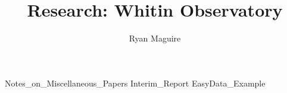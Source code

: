 \documentclass[crop=false,class=book,oneside]{standalone}
\begin{document}
    \newif\ifresearchwhitinobservatory
    \ifx\ifresearch\undefined
        \title{Research: Whitin Observatory}
        \author{Ryan Maguire}
        \date{\vspace{-5ex}}
        \maketitle
        \tableofcontents
        \listoffigures
        \listoftables
        \clearpage
    \fi
    
              {Notes_on_Miscellaneous_Papers}
    {Interim_Report}
    {EasyData_Example}
    \ifx\ifresearch\undefined
        
    \fi
\end{document}

